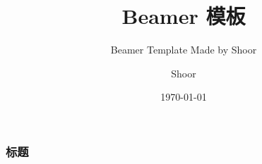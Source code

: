 \documentclass{beamer}
\title{Beamer 模板}
\author{Shoor}
\subtitle{Beamer Template Made by Shoor}
\institute{\LaTeX~Template}
\date{\today}
\begin{document}
\maketitle
\begin{frame}
    \frametitle{标题}
\end{frame}
\end{document}
